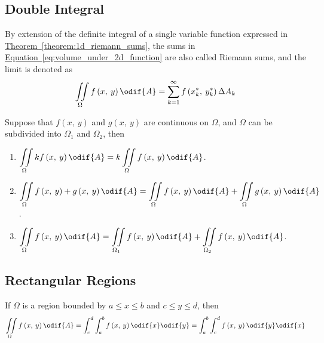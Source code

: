 \documentclass{article}
\begin{document}
\subsection{Double Integral}
\begin{definition}
    By extension of the definite integral of a single variable function
    expressed in
    \hyperref[theorem:1d_riemann_sums]{Theorem~\ref{theorem:1d_riemann_sums}},
    the sums in
    \hyperref[eq:volume_under_2d_function]{Equation~\ref{eq:volume_under_2d_function}}
    are also called Riemann sums, and the limit is denoted as
    \begin{equation*}
        \iint\limits_{\Omega} f\left( x,\: y \right)  \odif{A}
        = \sum_{k=1}^{\infty} f\left( x_k^\ast,\: y_k^\ast \right) \Delta A_k
    \end{equation*}
\end{definition}
\begin{tcolorboxlarge}[title={Properties of Double Integrals}]
    \begin{theorem}
        Suppose that \(f\left( x,\: y \right) \) and \(g\left( x,\: y \right)\) are continuous on
        \(\Omega\), and \(\Omega\) can be subdivided into \(\Omega_1\)
        and \(\Omega_2\), then
        \begin{enumerate}[label=\normalfont\alph*)]
            \item \(\displaystyle\iint\limits_\Omega kf\left( x,\: y \right) \odif{A}
                  = k\iint\limits_\Omega f\left( x,\: y \right) \odif{A}\).
            \item \(\displaystyle\iint\limits_\Omega f\left( x,\: y \right) + g\left( x,\: y \right) \odif{A}
                  = \iint\limits_\Omega f\left( x,\: y \right) \odif{A} + \iint\limits_\Omega g\left( x,\: y \right) \odif{A}\).
            \item \(\displaystyle\iint\limits_\Omega f\left( x,\: y \right) \odif{A}
                  = \iint\limits_{\Omega_1} f\left( x,\: y \right) \odif{A} + \iint\limits_{\Omega_2} f\left( x,\: y \right) \odif{A}\).
        \end{enumerate}
    \end{theorem}
\end{tcolorboxlarge}
\subsection{Rectangular Regions}
If \(\Omega\) is a region bounded by \(a \leq x \leq b\) and \(c \leq y
\leq d\), then
\begin{equation*}
    \iint\limits_{\Omega} f\left( x,\: y \right) \odif{A} = \int_c^d\int_a^b f\left( x,\: y \right) \odif{x} \odif{y} = \int_a^b\int_c^d f\left( x,\: y \right) \odif{y} \odif{x}
\end{equation*}
\end{document}
